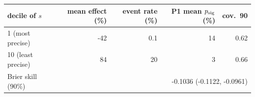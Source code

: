 \begin{tabular}{lrrrr}
\toprule
decile of $s$ & mean effect (\%) & event rate (\%) & P1 mean $p_{\mathrm{sig}}$ (\%) & cov.\ 90 \\
\midrule
1 (most precise) & -42 & 0.1 & 14 & 0.62 \\
10 (least precise) & 84 & 20 & 3 & 0.66 \\
\midrule
Brier skill (90\%) & \multicolumn{4}{r}{-0.1036 (-0.1122, -0.0961)} \\
\bottomrule
\end{tabular}
